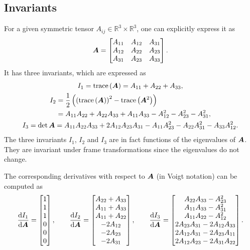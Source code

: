 \subsection{Invariants}
For a given symmetric tensor $A_{ij}\in\mathbb{R}^3\times\mathbb{R}^3$, one can explicitly express it as
\begin{gather}
\bm{A}=
\begin{bmatrix}
A_{11}&A_{12}&A_{31}\\
A_{12}&A_{22}&A_{23}\\
A_{31}&A_{23}&A_{33}
\end{bmatrix}.
\end{gather}
It has three invariants, which are expressed as
\begin{gather}\label{eq:tensor_invariant}
I_1=\text{trace}\left(\bm{A}\right)=A_{11}+A_{22}+A_{33},\\
\begin{split}
I_2&=\dfrac{1}{2}\left(\left(\text{trace}\left(\bm{A}\right)\right)^2-\text{trace}\left(\bm{A}^2\right)\right)\\
&=A_{11}A_{22}+A_{22}A_{33}+A_{11}A_{33}-A_{12}^2-A_{23}^2-A_{31}^2,
\end{split}\\
I_3=\det{\bm{A}}=A_{11}A_{22}A_{33}+2A_{12}A_{23}A_{31}-A_{11}A_{23}^2-A_{22}A_{31}^2-A_{33}A_{12}^2.
\end{gather}
The three invariants $I_1$, $I_2$ and $I_3$ are in fact functions of the eigenvalues of $\bm{A}$.
They are invariant under frame transformations since the eigenvalues do not change.

The corresponding derivatives with respect to $\bm{A}$ (in Voigt notation) can be computed as
\begin{gather}\label{eq:tensor_invariant_derivative}
	\dfrac{\mathrm{d}I_1}{\mathrm{d}\bm{A}}=\begin{bmatrix}
		1 \\
		1 \\
		1 \\
		0 \\
		0 \\
		0
	\end{bmatrix},\qquad
	\dfrac{\mathrm{d}I_2}{\mathrm{d}\bm{A}}=\begin{bmatrix}
		A_{22}+A_{33} \\
		A_{11}+A_{33} \\
		A_{11}+A_{22} \\
		-2A_{12}      \\
		-2A_{23}      \\
		-2A_{31}
	\end{bmatrix},\qquad
	\dfrac{\mathrm{d}I_3}{\mathrm{d}\bm{A}}=\begin{bmatrix}
		A_{22}A_{33}-A_{23}^2       \\
		A_{11}A_{33}-A_{31}^2       \\
		A_{11}A_{22}-A_{12}^2       \\
		2A_{23}A_{31}-2A_{12}A_{33} \\
		2A_{12}A_{31}-2A_{23}A_{11} \\
		2A_{12}A_{23}-2A_{31}A_{22}
	\end{bmatrix}.
\end{gather}

